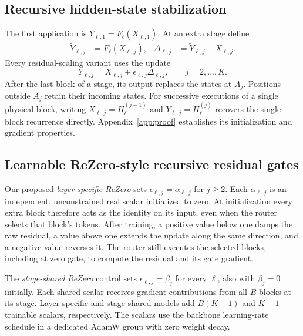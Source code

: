 \documentclass[11pt,letterpaper]{article}
\begin{document}
\subsection{Recursive hidden-state stabilization}
\label{sec:stabilization}
The first application is \(Y_{\ell,1}=F_\ell(X_{\ell,1})\). At an extra stage define
\begin{align}
  \widetilde Y_{\ell,j}&=F_\ell(X_{\ell,j}),&
  \Delta_{\ell,j}&=\widetilde Y_{\ell,j}-X_{\ell,j}. \label{eq:recursive_delta}
\end{align}
Every residual-scaling variant uses the update
\begin{equation}
  \boxed{Y_{\ell,j}=X_{\ell,j}+\epsilon_{\ell,j}\Delta_{\ell,j},
       \qquad j=2,\ldots,K.}
  \label{eq:general_recursive_scaling}
\end{equation}
After the last block of a stage, its output replaces the states at \(A_j\). Positions outside \(A_j\) retain their incoming states. For successive executions of a single physical block, writing \(X_{\ell,j}=H_\ell^{(j-1)}\) and \(Y_{\ell,j}=H_\ell^{(j)}\) recovers the single-block recurrence directly. Appendix~\ref{app:proof} establishes its initialization and gradient properties.

\subsection{Learnable ReZero-style recursive residual gates}
\label{sec:rezero_recursion}
Our proposed \emph{layer-specific ReZero} sets \(\epsilon_{\ell,j}=\alpha_{\ell,j}\) for \(j\ge2\). Each \(\alpha_{\ell,j}\) is an independent, unconstrained real scalar initialized to zero. At initialization every extra block therefore acts as the identity on its input, even when the router selects that block's tokens. After training, a positive value below one damps the raw residual, a value above one extends the update along the same direction, and a negative value reverses it. The router still executes the selected blocks, including at zero gate, to compute the residual and its gate gradient.

The \emph{stage-shared ReZero} control sets \(\epsilon_{\ell,j}=\beta_j\) for every \(\ell\), also with \(\beta_j=0\) initially. Each shared scalar receives gradient contributions from all \(B\) blocks at its stage. Layer-specific and stage-shared models add \(B(K-1)\) and \(K-1\) trainable scalars, respectively. The scalars use the backbone learning-rate schedule in a dedicated AdamW group with zero weight decay.
\end{document}
